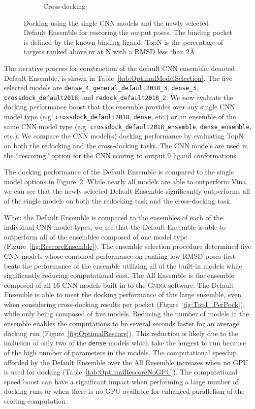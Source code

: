 \documentclass[journal=jcisd8,manuscript=article]{achemso}
\begin{document}
\begin{figure}
\begin{subfigure}[b]{0.48\textwidth}
		\caption{Cross-docking}
		\label{fig:RescoreSingleCrossdock}
        \end{subfigure}    
	\caption{Docking using the single CNN models and the newly selected Default Ensemble for rescoring the output poses. The binding pocket is defined by the known binding ligand. TopN is the percentage of targets ranked above or at N with a RMSD less than 2{\AA}.}
	\label{fig:RescoreSingle}
\end{figure}

The iterative process for construction of the default CNN ensemble, denoted Default Ensemble, is shown in Table~\ref{tab:OptimalModelSelection}. The five selected models are \texttt{dense\_4}, \texttt{general\_default2018\_3}, \texttt{dense\_3}, \texttt{crossdock\_default2018}, and \texttt{redock\_default2018\_2}. We now evaluate the docking performance boost that this ensemble provides over any single CNN model type (e.g. \texttt{crossdock\_default2018}, \texttt{dense}, etc.) or an ensemble of the same CNN model type (e.g. \texttt{crossdock\_default2018\_ensemble}, \texttt{dense\_ensemble}, etc.). We compare the CNN model(s) docking performance by evaluating TopN on both the redocking and the cross-docking tasks. The CNN models are used in the ``rescoring'' option for the CNN scoring to output 9 ligand conformations. 

The docking performance of the Default Ensemble is compared to the single model options in Figure~\ref{fig:RescoreSingle}. While nearly all models are able to outperform Vina, we can see that the newly selected Default Ensemble significantly outperforms all of the single models on both the redocking task and the cross-docking task.

When the Default Ensemble is compared to the ensembles of each of the individual CNN model types, we see that the Default Ensemble is able to outperform all of the ensembles composed of one model type (Figure~\ref{fig:RescoreEnsemble}). The ensemble selection procedure determined five CNN models whose combined performance on ranking low RMSD poses first beats the performance of the ensemble utilizing all of the built-in models while significantly reducing computational cost. The All Ensemble is the ensemble composed of all 16 CNN models built-in to the \textsc{Gnina} software. The Default Ensemble is able to meet the docking performance of this large ensemble, even when considering cross-docking results per pocket (Figure~\ref{fig:Top1_PerPock}), while only being composed of five models. Reducing the number of models in the ensemble enables the computations to be several seconds faster for an average docking run (Figure~\ref{fig:OptimalRescore}). This reduction is likely due to the inclusion of only two of the \texttt{dense} models which take the longest to run because of the high number of parameters in the models. The computational speedup afforded by the Default Ensemble over the All Ensemble increases when no GPU is used for docking (Table~\ref{tab:OptimalRescoreNoGPU}). The computational speed boost can have a significant impact when performing a large number of docking runs or when there is no GPU available for enhanced parallelism of the scoring computation.
\end{document}
